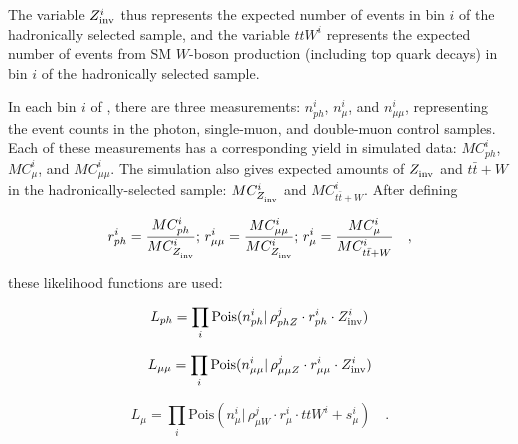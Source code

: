 The variable $\zInv{i}$ thus represents the expected number of \znunu
events in \HT bin $i$ of the hadronically selected sample, and the
variable $ttW^i$ represents the expected number of events from SM
$W$-boson production (including top quark decays) in \HT bin $i$ of
the hadronically selected sample.

In each bin $i$ of \HT, there are three measurements: $n_{ph}^i$,
$n_{\mu}^i$, and $n_{\mu\mu}^i$, representing the event counts in the
photon, single-muon, and double-muon control samples.  Each of these
measurements has a corresponding yield in simulated data: $MC_{ph}^i$,
$MC_{\mu}^i$, and $MC_{\mu\mu}^i$.  The simulation also gives expected
amounts of $\zInv{}$ and $t\bar{t}+W$ in the hadronically-selected
sample: $MC_{\zInv{}}^i$ and $MC_{t\bar{t}+W}^i$.  After defining

\begin{equation}
r_{ph}^i = \frac{MC_{ph}^i}{MC_{\zInv{}}^i};\, r_{\mu\mu}^i =
\frac{MC_{\mu\mu}^i}{MC_{\zInv{}}^i};\, r_{\mu}^i =
\frac{MC_{\mu}^i}{MC_{t\bar{t}+W}^i}\quad ,
\end{equation}

these likelihood functions are used:

\begin{equation}
\label{eq:photonLikelihood}
L_{ph}= \prod_i \mathrm{Pois}(n_{ph}^i |\, \rho_{phZ}^j \cdot
r_{ph}^{i} \cdot \zInv{i})
\end{equation}

\begin{equation}
\label{eq:mumuLikelihood}
L_{\mu\mu}=\prod_i \mathrm{Pois}(n_{\mu\mu}^i |\, \rho_{\mu\mu Z}^j
\cdot r_{\mu\mu}^{i} \cdot \zInv{i})
\end{equation}

\begin{equation}
\label{eq:muonLikelihood}
L_{\mu}=\prod_i \mathrm{Pois}(n_{\mu}^i |\, \rho_{\mu W}^j \cdot
r_{\mu}^{i} \cdot ttW^{i} + s_{\mu}^i)\quad .
\end{equation}

